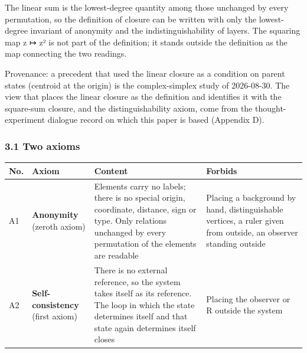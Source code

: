 \documentclass[
  a4paper,
]{article}
\newcounter{none} %
\begin{document}
The linear sum is the lowest-degree quantity among those unchanged by
every permutation, so the definition of closure can be written with only
the lowest-degree invariant of anonymity and the indistinguishability of
layers. The squaring map z ↦ z² is not part of the definition; it stands
outside the definition as the map connecting the two readings.

Provenance: a precedent that used the linear closure as a condition on
parent states (centroid at the origin) is the complex-simplex study of
2026-08-30. The view that places the linear closure as the definition
and identifies it with the square-sum closure, and the
distinguishability axiom, come from the thought-experiment dialogue
record on which this paper is based (Appendix D).

\subsubsection{3.1 Two axioms}\label{two-axioms}

{\def\LTcaptype{none} %
\begin{longtable}[]{@{}
  >{\raggedright\arraybackslash}p{}
  >{\raggedright\arraybackslash}p{}
  >{\raggedright\arraybackslash}p{}
  >{\raggedright\arraybackslash}p{}@{}}
\toprule\noalign{}
\begin{minipage}[b]{\linewidth}\raggedright
No.
\end{minipage} & \begin{minipage}[b]{\linewidth}\raggedright
Axiom
\end{minipage} & \begin{minipage}[b]{\linewidth}\raggedright
Content
\end{minipage} & \begin{minipage}[b]{\linewidth}\raggedright
Forbids
\end{minipage} \\
\midrule\noalign{}
\endhead
\bottomrule\noalign{}
\endlastfoot
A1 & \textbf{Anonymity} (zeroth axiom) & Elements carry no labels; there
is no special origin, coordinate, distance, sign or type. Only relations
unchanged by every permutation of the elements are readable & Placing a
background by hand, distinguishable vertices, a ruler given from
outside, an observer standing outside \\
A2 & \textbf{Self-consistency} (first axiom) & There is no external
reference, so the system takes itself as its reference. The loop in
which the state determines itself and that state again determines itself
closes & Placing the observer or R outside the system \\
\end{longtable}
}
\end{document}

